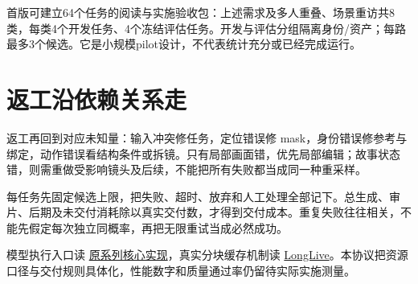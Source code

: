 首版可建立64个任务的阅读与实施验收包：上述需求及多人重叠、场景重访共8类，每类4个开发任务、4个冻结评估任务。开发与评估分组隔离身份/资产；每路最多3个候选。它是小规模pilot设计，不代表统计充分或已经完成运行。

\section{返工沿依赖关系走}\label{seedance-m26-ux8fd4ux5de5ux6cbfux4f9dux8d56ux5173ux7cfbux8d70}

返工再回到对应未知量：输入冲突修任务，定位错误修 mask，身份错误修参考与绑定，动作错误看结构条件或拆镜。只有局部画面错，优先局部编辑；故事状态错，则需重做受影响镜头及后续，不能把所有失败都当成同一种重采样。

每任务先固定候选上限，把失败、超时、放弃和人工处理全部记下。总生成、审片、后期及未交付消耗除以真实交付数，才得到交付成本。重复失败往往相关，不能先假定每次独立同概率，再把无限重试当成必然成功。

模型执行入口读 \href{https://github.com/Lightricks/LTX-2/tree/bd92a5f408eb8c99f8c05e9fe2fcaaec8b56b638/packages/ltx-core}{原系列核心实现}，真实分块缓存机制读 \href{https://github.com/NVlabs/LongLive}{LongLive}。本协议把资源口径与交付规则具体化，性能数字和质量通过率仍留待实际实施测量。
